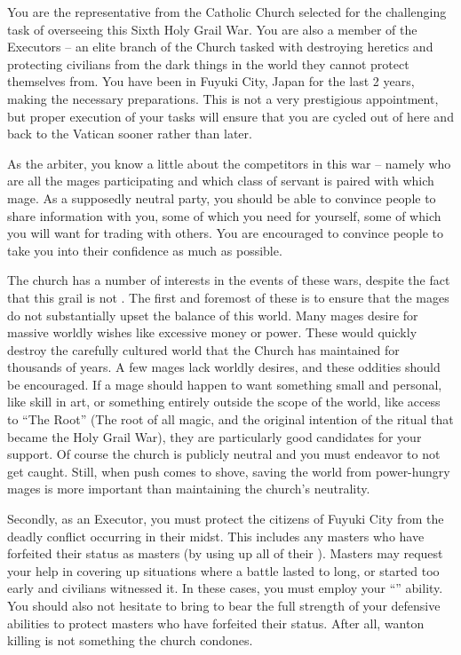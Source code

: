 \documentclass[char]{FateDarkDawn}
\begin{document}
\name{\cChurch{}}

You are the representative from the Catholic Church selected for the challenging task of overseeing this Sixth Holy Grail War. You are also a member of the Executors -- an elite branch of the Church tasked with destroying heretics and protecting civilians from the dark things in the world they cannot protect themselves from. You have been in Fuyuki City, Japan for the last 2 years, making the necessary preparations. This is not a very prestigious appointment, but proper execution of your tasks will ensure that you are cycled out of here and back to the Vatican sooner rather than later.

As the arbiter, you know a little about the competitors in this war -- namely who are all the mages participating and which class of servant is paired with which mage. As a supposedly neutral party, you should be able to convince people to share information with you, some of which you need for yourself, some of which you will want for trading with others. You are encouraged to convince people to take you into their confidence as much as possible.

The church has a number of interests in the events of these wars, despite the fact that this grail is not \emph{\iGrail{\MYname}}. The first and foremost of these is to ensure that the mages do not substantially upset the balance of this world. Many mages desire \iGrail{\MYname} for massive worldly wishes like excessive money or power. These would quickly destroy the carefully cultured world that the Church has maintained for thousands of years. A few mages lack worldly desires, and these oddities should be encouraged. If a mage should happen to want something small and personal, like skill in art, or something entirely outside the scope of the world, like access to ``The Root'' (The root of all magic, and the original intention of the ritual that became the Holy Grail War), they are particularly good candidates for your support. Of course the church is publicly neutral and you must endeavor to not get caught. Still, when push comes to shove, saving the world from power-hungry mages is more important than maintaining the church's neutrality.

Secondly, as an Executor, you must protect the citizens of Fuyuki City from the deadly conflict occurring in their midst. This includes any masters who have forfeited their status as masters (by using up all of their \iCommand{}). Masters may request your help in covering up situations where a battle lasted to long, or started too early and civilians witnessed it. In these cases, you must employ your ``\aForget{}'' ability. You should also not hesitate to bring to bear the full strength of your defensive abilities to protect masters who have forfeited their status. After all, wanton killing is not something the church condones.
\end{document}
